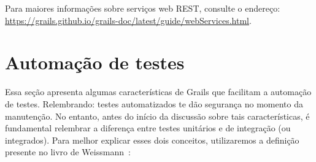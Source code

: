 \vspace{0.5cm}

Para  maiores  informações  sobre   serviços  web  REST,  consulte  o  endereço:
{\footnotesize\url{https://grails.github.io/grails-doc/latest/guide/webServices.html}}.

\section{Automação de testes}

\vspace{0.5cm}

Essa seção apresenta algumas características de Grails que facilitam a automação
de  testes. Relembrando:  testes automatizados  te dão  segurança no  momento da
manutenção. No entanto, antes do início da discussão sobre tais características,
é fundamental relembrar  a diferença entre testes unitários  e de integração (ou
integrados). Para melhor explicar esses dois conceitos, utilizaremos a definição
presente no livro de Weissmann~\cite{wei15}: 

\vspace{0.2cm}

